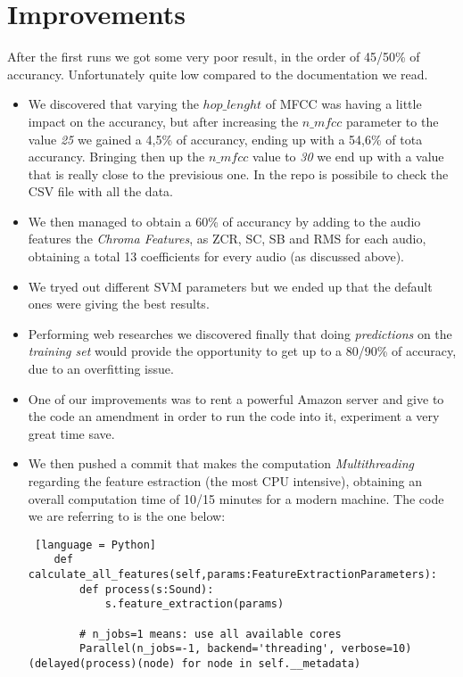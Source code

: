 \documentclass{article}
\begin{document}
\section*{Improvements}
After the first runs we got some very poor result, in the order of 45/50\% of accurancy. Unfortunately quite low compared to the documentation we read.
\begin{itemize}
\item We discovered that varying the $hop\_lenght$ of MFCC was having a little impact on the accurancy, but after increasing the $n\_mfcc$ parameter to the value \emph{25} we gained a 4,5\% of accurancy, ending up with a 54,6\% of tota accurancy. Bringing then up the $n\_mfcc$ value to \emph{30} we end up with a value that is really close to the previsious one. In the repo is possibile to check the CSV file with all the data.
\item We then managed to obtain a 60\% of accurancy by adding to the audio features the \emph{Chroma Features}, as ZCR, SC, SB and RMS for each audio, obtaining a total 13 coefficients for every audio (as discussed above).
\item We tryed out different SVM parameters but we ended up that the default ones were giving the best results.
\item Performing web researches we discovered finally that doing \emph{predictions} on the \emph{training set} would provide the opportunity to get up to a 80/90\% of accuracy, due to an overfitting issue.
\item One of our improvements was to rent a powerful Amazon server and give to the code an amendment in order to run the code into it, experiment a very great time save.
\item We then pushed a commit that makes the computation \emph{Multithreading} regarding the feature estraction (the most CPU intensive), obtaining an overall computation time of 10/15 minutes for a modern machine. The code we are referring to is the one below:
\begin{lstlisting} [language = Python]
    def calculate_all_features(self,params:FeatureExtractionParameters):
        def process(s:Sound):
            s.feature_extraction(params)
        
        # n_jobs=1 means: use all available cores
        Parallel(n_jobs=-1, backend='threading', verbose=10)(delayed(process)(node) for node in self.__metadata)
\end{lstlisting}
\end{itemize}
\end{document}
